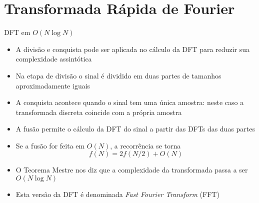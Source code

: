 \section{Transformada Rápida de Fourier}

\begin{frame}[fragile]{DFT em $O(N\log N)$}

    \begin{itemize}
        \item A divisão e conquista pode ser aplicada no cálculo da DFT para reduzir sua
            complexidade assintótica

        \item Na etapa de divisão o sinal é dividido em duas partes de tamanhos aproximadamente
            iguais

        \item A conquista acontece quando o sinal tem uma única amostra: neste caso a transformada
            discreta coincide com a própria amostra

        \item A fusão permite o cálculo da DFT do sinal a partir das DFTs das duas partes

        \item Se a fusão for feita em $O(N)$, a recorrência se torna
        \[
            f(N) = 2f(N/2) + O(N)
        \]

        \item O Teorema Mestre nos diz que a complexidade da transformada passa a ser $O(N\log N)$

        \item Esta versão da DFT é denominada \textit{Fast Fourier Transform} (FFT)
    \end{itemize}

\end{frame}

